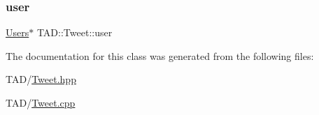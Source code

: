 \mbox{\label{class_t_a_d_1_1_tweet_a6dd31e59ddf90b5fe0083f1dbf14104b}} 
\subsubsection{\texorpdfstring{user}{user}}
{\footnotesize\ttfamily \hyperlink{class_t_a_d_1_1_users}{Users}$\ast$ T\+A\+D\+::\+Tweet\+::user\hspace{0.3cm}{\ttfamily [private]}}



The documentation for this class was generated from the following files\+:\begin{DoxyCompactItemize}
\item 
T\+A\+D/\hyperlink{_tweet_8hpp}{Tweet.\+hpp}\item 
T\+A\+D/\hyperlink{_tweet_8cpp}{Tweet.\+cpp}\end{DoxyCompactItemize}
